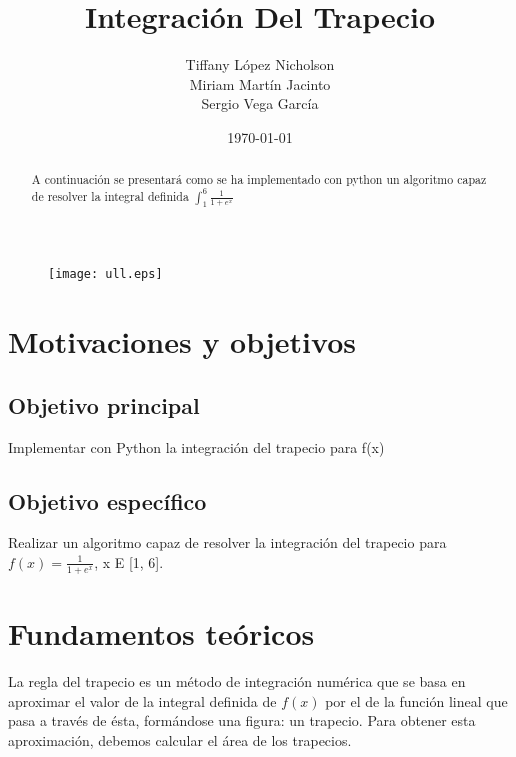 \documentclass{article}
\begin{document}
  \begin{figure}[lt]
    \texttt{[image: ull.eps]}
  \end{figure}
  \title{Integración Del Trapecio}
  \author{Tiffany López Nicholson \\ Miriam Martín Jacinto \\ Sergio Vega García}
  \date{\today}
  \maketitle

  \begin{abstract}
    \begin{center}
       A continuación se presentará como se ha implementado con python un algoritmo capaz de resolver la integral definida $\int_{1}^{6} \frac{1}{1+e^x}$
    \end{center}
  \end{abstract}
  \pagebreak


  \tableofcontents
  \pagebreak
  
  
  \section{Motivaciones y objetivos}
    \subsection{Objetivo principal}
       Implementar con Python la integración del trapecio para f(x) %
    \subsection{Objetivo específico} 
       Realizar un algoritmo capaz de resolver la integración del trapecio para $ f(x) = \frac{1}{1 + e^{x}}$, x E [1, 6]. %
  \pagebreak


  \section{Fundamentos teóricos}
    La regla del trapecio es un método de integración numérica que se basa en aproximar el valor de la integral definida de $f(x)$ por el de la función lineal que pasa a través de ésta, formándose una figura: un trapecio. Para obtener esta aproximación, debemos calcular el área de los trapecios.
    
\end{document}
